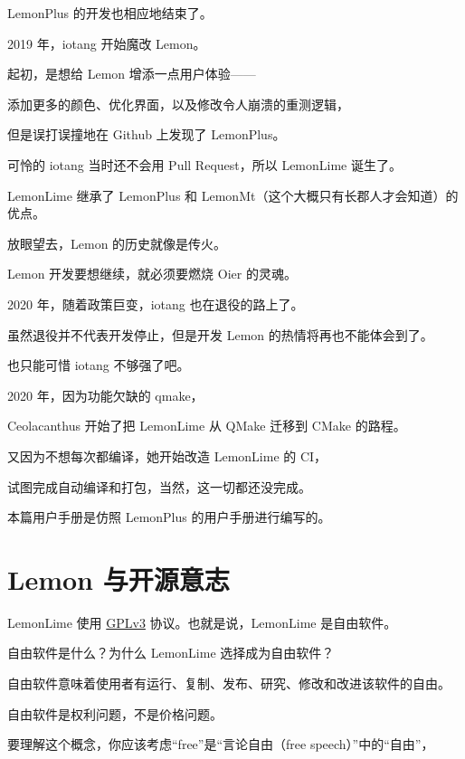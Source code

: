 \documentclass[UTF-8]{ctexart}
\begin{document}
		LemonPlus 的开发也相应地结束了。\newline
		
		2019 年，iotang 开始魔改 Lemon。
		
		起初，是想给 Lemon 增添一点用户体验——
		
		添加更多的颜色、优化界面，以及修改令人崩溃的重测逻辑，
		
		但是误打误撞地在 Github 上发现了 LemonPlus。
		
		可怜的 iotang 当时还不会用 Pull Request，所以 LemonLime 诞生了。
		
		LemonLime 继承了 LemonPlus 和 LemonMt（这个大概只有长郡人才会知道）的优点。\newline
		
		放眼望去，Lemon 的历史就像是传火。
		
		Lemon 开发要想继续，就必须要燃烧 Oier 的灵魂。
		
		2020 年，随着政策巨变，iotang 也在退役的路上了。
		
		虽然退役并不代表开发停止，但是开发 Lemon 的热情将再也不能体会到了。
		
		也只能可惜 iotang 不够强了吧。\newline
		
		2020 年，因为功能欠缺的 qmake，
		
		Ceolacanthus 开始了把 LemonLime 从 QMake 迁移到 CMake 的路程。
		
		又因为不想每次都编译，她开始改造 LemonLime 的 CI，
		
		试图完成自动编译和打包，当然，这一切都还没完成。\newline
		
		本篇用户手册是仿照 LemonPlus 的用户手册进行编写的。
		
	\newpage
	
	\section{Lemon 与开源意志}
		
		LemonLime 使用 \href{https://www.gnu.org/licenses/gpl-3.0.html}{GPLv3} 协议。也就是说，LemonLime 是自由软件。\newline
		
		自由软件是什么？为什么 LemonLime 选择成为自由软件？
		
		自由软件意味着使用者有运行、复制、发布、研究、修改和改进该软件的自由。
		
		自由软件是权利问题，不是价格问题。
		
		要理解这个概念，你应该考虑“free”是“言论自由（free speech）”中的“自由”，
		
\end{document}

